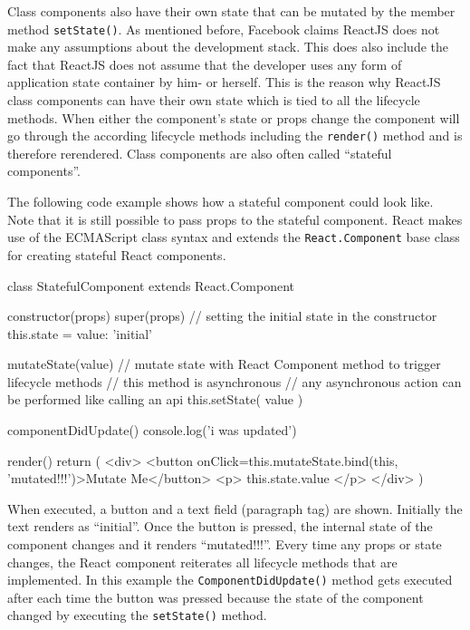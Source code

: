 Class components also have their own state that can be mutated by the member method \texttt{setState()}. As mentioned before, Facebook claims ReactJS does not make any assumptions about the development stack. This does also include the fact that ReactJS does not assume that the developer uses any form of application state container by him- or herself. This is the reason why ReactJS class components can have their own state which is tied to all the lifecycle methods. When either the component's state or props change the component will go through the according lifecycle methods including the \texttt{render()} method and is therefore rerendered. Class components are also often called \enquote{stateful components}.

The following code example shows how a stateful component could look like. Note that it is still possible to pass props to the stateful component. React makes use of the ECMAScript class syntax and extends the \texttt{React.Component} base class for creating stateful React components.

\begin{JsCode}
class StatefulComponent extends React.Component {
  
  constructor(props) {
    super(props)
    // setting the initial state in the constructor
    this.state = {
      value: 'initial'
    }
  }
  
  mutateState(value) {
    // mutate state with React Component method to trigger lifecycle methods
    // this method is asynchronous
    // any asynchronous action can be performed like calling an api
    this.setState({ value })
  }
  
  componentDidUpdate() {
  	console.log('i was updated')
  }
  
  render() { 
    return (
      <div>
        <button onClick={this.mutateState.bind(this, 'mutated!!!')}>Mutate Me</button>
        <p>{ this.state.value }</p>
      </div>
    )
  }
}
\end{JsCode}

When executed, a button and a text field (paragraph tag) are shown. Initially the text renders as \enquote{initial}. Once the button is pressed, the internal state of the component changes and it renders \enquote{mutated!!!}. Every time any props or state changes, the React component reiterates all lifecycle methods that are implemented. In this example the \texttt{ComponentDidUpdate()} method gets executed after each time the button was pressed because the state of the component changed by executing the \texttt{setState()} method.

